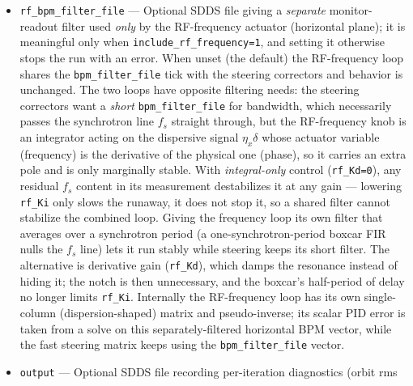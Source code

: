 \documentclass[11pt]{article}
\begin{document}
\begin{itemize}
  Each filter file (including \verb|rf_bpm_filter_file| below) may contain \emph{several SDDS
  pages}, in which case the pages form a \emph{cascade}: each page is one filter stage, the
  output of one stage is the input to the next, and the value returned is the last stage's
  output.  The net transfer function is the product $H(z)=\prod_k H_k(z)$ of the per-page
  stages, so, for example, two cascaded unit-DC-gain one-pole low-passes give a steeper
  two-pole roll-off while still leaving the steady state unchanged.  The number of
  coefficients (rows) may differ from one stage to the next.  A file with a single page is a
  single filter and behaves exactly as before.
\item \verb|rf_bpm_filter_file| --- Optional SDDS file giving a \emph{separate} monitor-readout
  filter used \emph{only} by the RF-frequency actuator (horizontal plane); it is meaningful only
  when \verb|include_rf_frequency=1|, and setting it otherwise stops the run with an error.  When unset (the default) the RF-frequency loop shares the \verb|bpm_filter_file| tick
  with the steering correctors and behavior is unchanged.  The two loops have opposite filtering
  needs: the steering correctors want a \emph{short} \verb|bpm_filter_file| for bandwidth, which
  necessarily passes the synchrotron line $f_s$ straight through, but the RF-frequency knob is an
  integrator acting on the dispersive signal $\eta_x\delta$ whose actuator variable (frequency)
  is the derivative of the physical one (phase), so it carries an extra pole and is only
  marginally stable.  With \emph{integral-only} control (\verb|rf_Kd=0|), any residual $f_s$
  content in its measurement destabilizes it at any gain --- lowering \verb|rf_Ki| only slows the
  runaway, it does not stop it, so a shared filter cannot stabilize the combined loop.  Giving the
  frequency loop its own filter that averages over a synchrotron period (a one-synchrotron-period
  boxcar FIR nulls the $f_s$ line) lets it run stably while steering keeps its short filter.  The
  alternative is derivative gain (\verb|rf_Kd|), which damps the resonance instead of hiding it;
  the notch is then unnecessary, and the boxcar's half-period of delay no longer limits
  \verb|rf_Ki|.  Internally the RF-frequency loop has its own
  single-column (dispersion-shaped) matrix and pseudo-inverse; its scalar PID error is taken
  from a solve on this separately-filtered horizontal BPM vector, while the fast steering matrix
  keeps using the \verb|bpm_filter_file| vector.
\item \verb|output| --- Optional SDDS file recording per-iteration diagnostics (orbit rms

\end{itemize}
\end{document}
